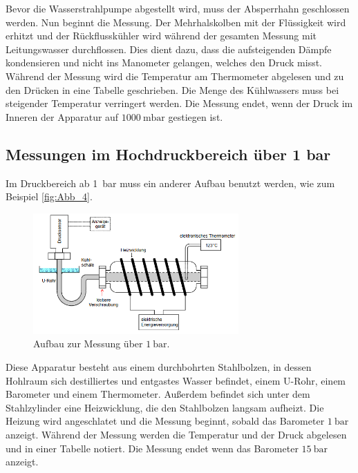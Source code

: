 Bevor die Wasserstrahlpumpe abgestellt wird, muss der Absperrhahn geschlossen werden.
Nun beginnt die Messung.
Der Mehrhalskolben mit der Flüssigkeit wird erhitzt und der Rückflusskühler wird während der gesamten Messung mit Leitungswasser durchflossen.
Dies dient dazu, dass die aufsteigenden Dämpfe kondensieren und nicht ins Manometer gelangen, welches den Druck misst.
Während der Messung wird die Temperatur am Thermometer abgelesen und zu den Drücken in eine Tabelle geschrieben.
Die Menge des Kühlwassers muss bei steigender Temperatur verringert werden.
Die Messung endet, wenn der Druck im Inneren der Apparatur auf $\qty{1000}{\milli\bar}$ gestiegen ist.

\subsection{Messungen im Hochdruckbereich über 1 bar} %
\label{sub:M_Hochdruckbereich}
Im Druckbereich ab \qty{1}{\bar} muss ein anderer Aufbau benutzt werden, wie zum Beispiel \autoref{fig:Abb_4}.
\begin{figure}[H]
    \centering
    \includegraphics[width=0.7\textwidth]{build/Abb_4.PNG}
    \caption {Aufbau zur Messung über $\qty{1}{\bar}$.\cite{V203}}
    \label{fig:Abb_4}
\end{figure}
Diese Apparatur besteht aus einem durchbohrten Stahlbolzen, in dessen Hohlraum sich destilliertes und entgastes Wasser befindet,
einem U-Rohr, einem Barometer und einem Thermometer.
Außerdem befindet sich unter dem Stahlzylinder eine Heizwicklung, die den Stahlbolzen langsam aufheizt.
Die Heizung wird angeschlatet und die Messung beginnt, sobald das Barometer $\qty{1}{\bar}$ anzeigt.
Während der Messung werden die Temperatur und der Druck abgelesen und in einer Tabelle notiert.
Die Messung endet wenn das Barometer $\qty{15}{\bar}$ anzeigt.
